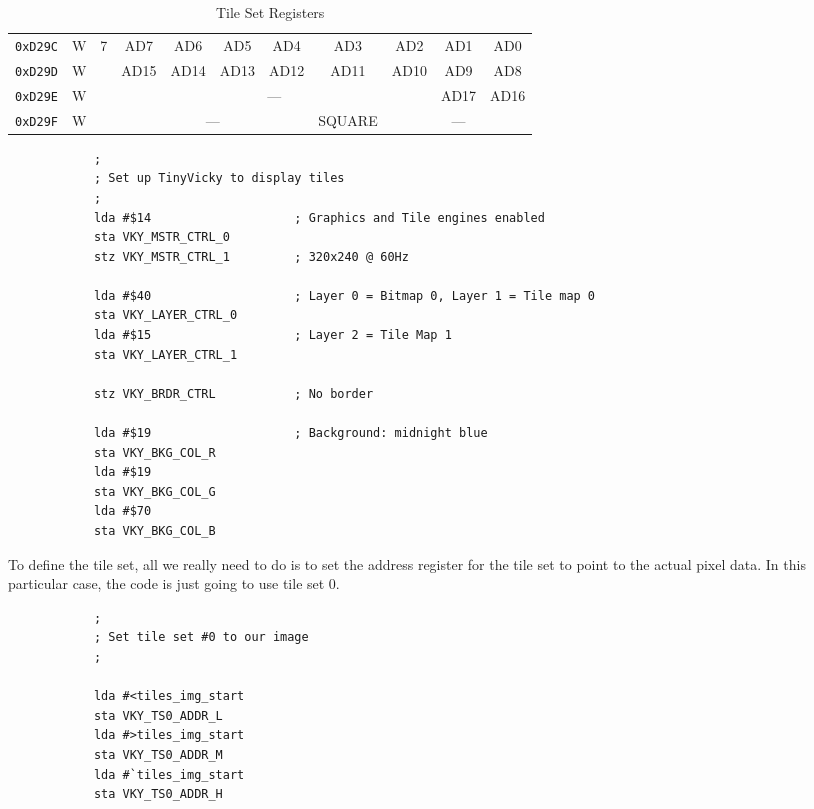 \begin{table}[ht]
\begin{center}
\begin{tabular}{|c|c|c|c|c|c|c|c|c|c|c|}
            \verb+0xD29C+ & W & \multirow{4}{*}{7} & AD7 & AD6 & AD5 & AD4 & AD3 & AD2 & AD1 & AD0 \\ \cline{1-2}\cline{4-11}
            \verb+0xD29D+ & W &                    & AD15 & AD14 & AD13 & AD12 & AD11 & AD10 & AD9 & AD8 \\ \cline{1-2}\cline{4-11}
            \verb+0xD29E+ & W &                    & \multicolumn{6}{|c|}{---} & AD17 & AD16 \\ \cline{1-2}\cline{4-11}
            \verb+0xD29F+ & W &                    & \multicolumn{4}{|c|}{---} & SQUARE & \multicolumn{3}{|c|}{---} \\ \hline\hline
        \end{tabular}
    \end{center}
    \caption{Tile Set Registers}
    \label{tab:tile_set_addr}
\end{table}


\begin{verbatim}
            ;
            ; Set up TinyVicky to display tiles
            ;
            lda #$14                    ; Graphics and Tile engines enabled
            sta VKY_MSTR_CTRL_0
            stz VKY_MSTR_CTRL_1         ; 320x240 @ 60Hz

            lda #$40                    ; Layer 0 = Bitmap 0, Layer 1 = Tile map 0
            sta VKY_LAYER_CTRL_0
            lda #$15                    ; Layer 2 = Tile Map 1
            sta VKY_LAYER_CTRL_1

            stz VKY_BRDR_CTRL           ; No border

            lda #$19                    ; Background: midnight blue
            sta VKY_BKG_COL_R
            lda #$19
            sta VKY_BKG_COL_G
            lda #$70
            sta VKY_BKG_COL_B
\end{verbatim}

To define the tile set, all we really need to do is to set the address register for the tile set to point to the actual pixel data. In this particular case, the code is just going to use tile set 0.

\begin{verbatim}
            ;
            ; Set tile set #0 to our image
            ;

            lda #<tiles_img_start
            sta VKY_TS0_ADDR_L
            lda #>tiles_img_start
            sta VKY_TS0_ADDR_M
            lda #`tiles_img_start
            sta VKY_TS0_ADDR_H
\end{verbatim}

